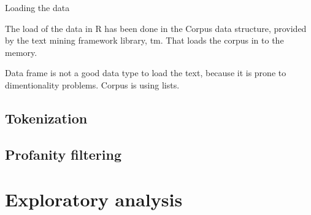 \documentclass{article}
\begin{document}
Loading the data

The load of the data in R has been done in the Corpus data structure, provided by the text mining framework library, tm. That loads the corpus in to the memory.

Data frame is not a good data type to load the text, because it is prone to dimentionality problems. Corpus is using lists.

\subsection{Tokenization}

\subsection{Profanity filtering}



\section{Exploratory analysis}
\end{document}
